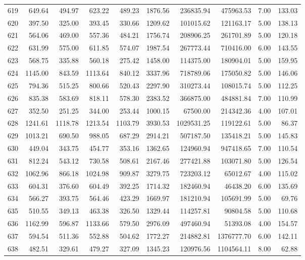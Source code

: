 \begin{tabular}{lrrrrrrrrr}
619 & 649.64 & 494.97 & 623.22 & 489.23 & 1876.56 & 236835.94 & 475963.53 & 7.00 & 133.03 \\
620 & 397.50 & 325.00 & 393.45 & 330.66 & 1209.62 & 101015.62 & 121163.17 & 5.00 & 138.13 \\
621 & 564.06 & 469.00 & 557.36 & 484.21 & 1756.74 & 208906.25 & 261701.89 & 5.00 & 120.18 \\
622 & 631.99 & 575.00 & 611.85 & 574.07 & 1987.54 & 267773.44 & 710416.00 & 6.00 & 143.55 \\
623 & 568.75 & 335.88 & 560.18 & 275.42 & 1458.00 & 114375.00 & 180904.01 & 5.00 & 159.95 \\
624 & 1145.00 & 843.59 & 1113.64 & 840.12 & 3337.96 & 718789.06 & 175050.82 & 5.00 & 146.06 \\
625 & 794.36 & 515.25 & 800.66 & 520.43 & 2297.90 & 310273.44 & 108015.74 & 5.00 & 112.25 \\
626 & 835.38 & 583.69 & 818.11 & 578.30 & 2383.52 & 366875.00 & 484881.84 & 7.00 & 110.99 \\
627 & 352.50 & 251.25 & 344.00 & 253.44 & 1000.15 & 67500.00 & 214342.36 & 4.00 & 107.01 \\
628 & 1241.61 & 1118.78 & 1213.54 & 1103.79 & 3930.53 & 1029531.25 & 119122.61 & 5.00 & 86.37 \\
629 & 1013.21 & 690.50 & 988.05 & 687.29 & 2914.21 & 507187.50 & 135418.21 & 5.00 & 145.83 \\
630 & 449.04 & 343.75 & 454.77 & 353.16 & 1362.65 & 124960.94 & 947418.65 & 7.00 & 110.54 \\
631 & 812.24 & 543.12 & 730.58 & 508.61 & 2167.46 & 277421.88 & 103071.80 & 5.00 & 126.54 \\
632 & 1062.96 & 866.18 & 1024.98 & 909.87 & 3279.75 & 723203.12 & 65012.67 & 4.00 & 115.02 \\
633 & 604.31 & 376.60 & 604.49 & 392.25 & 1714.32 & 182460.94 & 46438.20 & 6.00 & 135.69 \\
634 & 566.27 & 393.75 & 564.46 & 423.29 & 1669.97 & 181210.94 & 105691.99 & 5.00 & 69.76 \\
635 & 510.55 & 349.13 & 463.38 & 326.50 & 1329.44 & 114257.81 & 90804.58 & 5.00 & 110.68 \\
636 & 1162.99 & 596.87 & 1133.66 & 579.50 & 2976.09 & 497460.94 & 51393.08 & 4.00 & 154.57 \\
637 & 594.54 & 511.36 & 552.88 & 504.62 & 1772.27 & 214882.81 & 1376777.70 & 6.00 & 142.11 \\
638 & 482.51 & 329.61 & 479.27 & 327.09 & 1345.23 & 120976.56 & 1104564.11 & 8.00 & 62.88 \\

\end{tabular}
